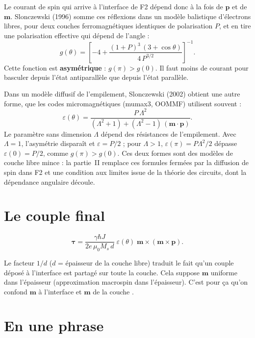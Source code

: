 \documentclass[11pt,a4paper]{article}
\newcommand{\vm}{\bm{m}}
\newcommand{\vp}{\bm{p}}
\begin{document}
Le courant de spin qui arrive à l'interface de F2 dépend donc à la fois de
$\vp$ et de $\vm$. Slonczewski (1996) somme ces réflexions dans un modèle
balistique d'électrons libres, pour deux couches ferromagnétiques
identiques de polarisation $P$, et en tire une polarisation effective qui
dépend de l'angle :
\begin{equation}
  g(\theta) = \left[-4 + \frac{(1+P)^3\,(3+\cos\theta)}{4\,P^{3/2}}\right]^{-1}.
  \label{eq:g}
\end{equation}
Cette fonction est \textbf{asymétrique} : $g(\pi) > g(0)$. Il faut moins
de courant pour basculer depuis l'état antiparallèle que depuis l'état
parallèle.

Dans un modèle diffusif de l'empilement, Slonczewski (2002) obtient une
autre forme, que les codes micromagnétiques (mumax3, OOMMF) utilisent
souvent :
\begin{equation}
  \varepsilon(\theta) = \frac{P\,\Lambda^2}
  {(\Lambda^2+1) + (\Lambda^2-1)\,(\vm\cdot\vp)}.
  \label{eq:eps}
\end{equation}
Le paramètre sans dimension $\Lambda$ dépend des résistances de
l'empilement. Avec $\Lambda = 1$, l'asymétrie disparaît et
$\varepsilon = P/2$ ; pour $\Lambda>1$, $\varepsilon(\pi) = P\Lambda^2/2$
dépasse $\varepsilon(0) = P/2$, comme $g(\pi) > g(0)$. Ces deux formes sont
des modèles de couche libre mince : la partie~II remplace ces formules
fermées par la diffusion de spin dans F2 et une condition aux limites
issue de la théorie des circuits, dont la dépendance angulaire découle.

\section{Le couple final}

\begin{equation}
  \bm{\tau} = \frac{\gamma\hbar J}{2e\,\mu_0 M_s\,d}\;
  \varepsilon(\theta)\;\vm\times(\vm\times\vp).
  \label{eq:tau}
\end{equation}

Le facteur $1/d$ ($d$ = épaisseur de la couche libre) traduit le fait
qu'un couple déposé à l'interface est partagé sur toute la couche. Cela
suppose $\vm$ uniforme dans l'épaisseur (approximation macrospin dans
l'épaisseur). C'est pour ça qu'on confond \og $\vm$ à l'interface \fg{}
et \og $\vm$ de la couche \fg.

\section*{En une phrase}
\end{document}
